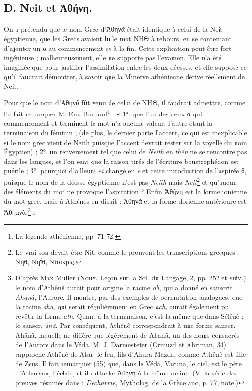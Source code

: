 \documentclass[a4paper, 11pt, oneside]{article}
\begin{document}
\subsection{D. Neit et Ἀθήνη.}
\paragraph{}
On a prétendu que le nom Grec d'Ἀθηνᾶ était identique à celui de la Neit égyptienne, que les Grecs avaient lu le mot ΝΗΘ à rebours, en se contentant d'ajouter un α au commencement et à la fin. Cette explication peut être fort ingénieuse ; malheureusement, elle ne supporte pas l'examen. Elle n'a été imaginée que pour justifier l'assimilation entre les deux déesses, et elle suppose ce qu'il faudrait démontrer, à savoir que la Minerve athénienne dérive réellement de Neit.

Pour que le nom d'Ἀθηνᾶ fût venu de celui de ΝΗΘ, il faudrait admettre, comme l'a fait remarquer M. Em. Burnouf\footnote{La légende athénienne, pp. 71-72.} : « 1°. que l'un des deux α qui commencement et terminent le mot n'a aucune valeur, l'autre étant la terminaison du féminin ; (de plus, le dernier porte l'accent, ce qui est inexplicable si le nom grec vient de Neith puisque l'accent devrait rester sur la voyelle du nom Égyptien) ; 2°. un renversement tel que celui de \emph{Neith} en \emph{thén} ne se rencontre pas dans les langues, et l'on sent que la raison tirée de l'écriture boustrophédon est puérile ; 3°. pourquoi d'ailleurs \emph{ei} changé en \emph{e} et cette introduction de l'aspirée θ, puisque le nom de la déesse égyptienne n'est pas \emph{Neith} mais \emph{Neit}\footnote{Le vrai son devait être Nit, comme le prouvent les transcriptions grecques : Νήθ, Νηΐθ, Νίτοκρις.} et qu'aucun des éléments du mot ne provoque l'aspiration ? Enfin Ἀθήνη est la forme ionienne du mot grec, mais à Athènes on disait : Ἀθηνᾶ et la forme dorienne antérieure est Ἀθηανᾶ.\footnote{D'après Max Muller (Nouv. Leçon sur la Sci. du Langage, 2, pp. 252 et suiv.) le nom d'Athênê aurait pour origine la racine \emph{ah}, qui a donné en sanscrit \emph{Ahanâ}, l'Aurore. Il montre, par des exemples de permutation analogues, que la racine \emph{aha}, qui serait régulièrement en Grec \emph{ach}, aurait également pu revêtir la forme \emph{ath}. Quant à la terminaison, c'est la même que dans Sélênê : le sanscr. \emph{ânâ}. Par conséquent, Athênê correspondrait à une forme sanscr. Ahânâ, laquelle ne diffère que légèrement de Ahanâ, un des noms consacrés de l'Aurore dans le Véda.  M. J. Darmesteter (Ormuzd et Ahriman, 34) rapproche Athênê de Atar, le feu, fils d'Ahura-Mazda, comme Athênê est fille de Zeus. Il fait remarquer (55) que, dans le Véda, Varuna, le ciel, est le père d'Atharvan, l'éclair, et il rattache Ἀθήνη à la même racine. (V. la série des preuves résumée dans : \emph{Decharme}, Mytholog. de la Grèce anc, p. 77, note.)} »
\end{document}
